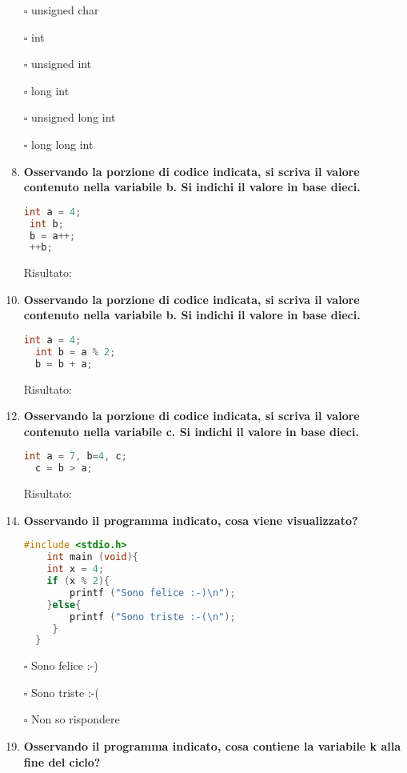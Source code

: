 \documentclass[9pt]{article}
\begin{document}
\begin{enumerate}
\item[$\square$] unsigned char
\item[$\square$] int
\item[$\square$] unsigned int
\item[$\square$] long int
\item[$\square$] unsigned long int
\item[$\square$] long long int

\item [\nonumber]
 \item {\bf Osservando la porzione di codice indicata, si scriva il valore contenuto nella variabile b. Si indichi il valore in base dieci.}
  \begin{lstlisting}[language=c]
 int a = 4;
 int b; 
 b = a++;
 ++b;
 \end{lstlisting}
 Risultato: 
 \item [\nonumber]
 \item{\bf Osservando la porzione di codice indicata, si scriva il valore contenuto nella variabile b. Si indichi il valore in base dieci.}
 
  \begin{lstlisting}[language=c]
  int a = 4;
  int b = a % 2;
  b = b + a;
 \end{lstlisting}
  Risultato: 
  \item [\nonumber]
  \item {\bf Osservando la porzione di codice indicata, si scriva il valore contenuto nella variabile c. Si indichi il valore in base dieci.}
 
  \begin{lstlisting}[language=c]
  int a = 7, b=4, c;
  c = b > a;
  \end{lstlisting}
  Risultato: 
  \item [\nonumber]
  \item {\bf Osservando il programma indicato, cosa viene visualizzato?}
  
  \begin{lstlisting}[language=c]
   #include <stdio.h>
    int main (void){
    int x = 4;
    if (x % 2){
    	printf ("Sono felice :-)\n");
    }else{
    	printf ("Sono triste :-(\n");
     }
  }
 \end{lstlisting}   
 
\item[$\square$] Sono felice :-)
\item[$\square$] Sono triste :-(
\item[$\square$] Non so rispondere
\item [\nonumber]
\item {\bf Osservando il programma indicato, cosa contiene la variabile k alla fine del ciclo?}


\end{enumerate}
\end{document}
